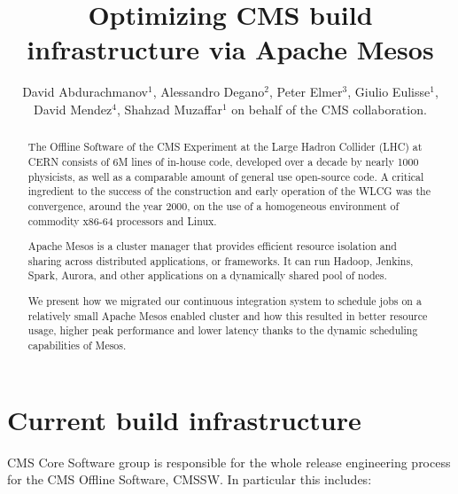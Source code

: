 \documentclass[a4paper]{jpconf}
\begin{document}

\title{Optimizing CMS build infrastructure via Apache Mesos}

\author{David Abdurachmanov$^1$, Alessandro Degano$^2$, Peter Elmer$^3$, Giulio
Eulisse$^1$, David Mendez$^4$, Shahzad Muzaffar$^1$ on behalf of the CMS collaboration.}

\address{$^1$ Fermilab, Batavia, IL 60510, USA}
\address{$^2$ Università di Torino}
\address{$^3$ Department of Physics, Princeton University, Princeton, NJ 08540,
USA}
\address{$^4$ Universidad de los Andes, Bogotá, Colombia}



\begin{abstract}

The Offline Software of the CMS Experiment at the Large Hadron Collider (LHC) at
CERN consists of 6M lines of in-house code, developed over a decade by nearly
1000 physicists, as well as a comparable amount of general use open-source code.
A critical ingredient to the success of the construction and early operation of
the WLCG was the convergence, around the year 2000, on the use of a homogeneous
environment of commodity x86-64 processors and Linux.

Apache Mesos is a cluster manager that provides efficient resource isolation and
sharing across distributed applications, or frameworks. It can run Hadoop,
Jenkins, Spark, Aurora, and other applications on a dynamically shared pool of
nodes.

We present how we migrated our continuous integration system to schedule jobs on
a relatively small Apache Mesos enabled cluster and how this resulted in better
resource usage, higher peak performance and lower latency thanks to the dynamic
scheduling capabilities of Mesos.

\end{abstract}


\section{Current build infrastructure}

CMS Core Software group is responsible for the whole release engineering process
for the CMS Offline Software, CMSSW\@. In particular this includes:
\end{document}

